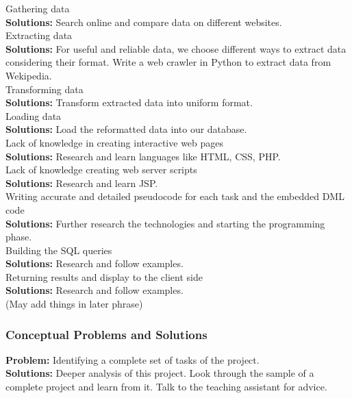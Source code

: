 \documentclass{article}
\begin{document}
 Gathering data\\
{\bfseries Solutions:} Search online and compare data on different websites. \\

 Extracting data\\
{\bfseries Solutions:} For useful and reliable data, we choose different ways to extract data considering their format. Write a web crawler in Python to extract data from Wekipedia.\\

 Transforming data\\
{\bfseries Solutions:} Transform extracted data into uniform format.\\

 Loading data\\
{\bfseries Solutions:} Load the reformatted data into our database.\\

 Lack of knowledge in creating interactive web pages\\
{\bfseries Solutions:} Research and learn languages like HTML, CSS, PHP. \\

 Lack of knowledge creating web server scripts\\
{\bfseries Solutions:} Research and learn JSP. \\

 Writing accurate and detailed pseudocode for each task and the embedded DML code \\
{\bfseries Solutions:} Further research the technologies and starting the programming phase. \\

 Building the SQL queries \\
{\bfseries Solutions:} Research and follow examples. \\

 Returning results and display to the client side\\
{\bfseries Solutions:} Research and follow examples. \\

{\color{red} (May add things in later phrase)}


\subsubsection{Conceptual Problems and Solutions}
{\bfseries Problem:} Identifying a complete set of tasks of the project.\\
{\bfseries Solutions:} Deeper analysis of this project. Look through the sample of a complete project and learn from it. Talk to the teaching assistant for advice. \\
\end{document}
